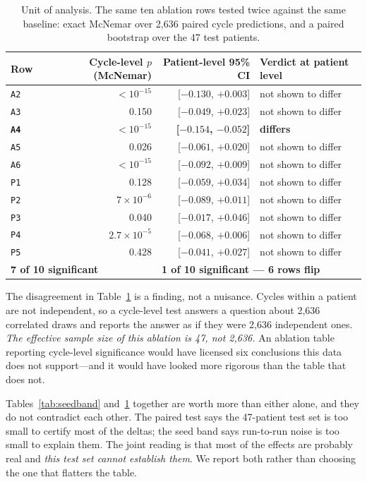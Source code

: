 \documentclass[journal,onecolumn]{IEEEtran}
\newcommand{\best}[1]{\textbf{#1}}
\begin{document}
\begin{table}[!t]
\centering
\caption{Unit of analysis. The same ten ablation rows tested twice against the
same baseline: exact McNemar over 2{,}636 paired cycle predictions, and a paired
bootstrap over the 47 test patients.}
\label{tab:unit}
\small
\begin{tabular}{lrrl}
\toprule
Row & Cycle-level $p$ (McNemar) & Patient-level 95\% CI & Verdict at patient level \\
\midrule
\texttt{A2} & $<10^{-15}$ & [$-0.130$, $+0.003$] & not shown to differ \\
\texttt{A3} & 0.150 & [$-0.049$, $+0.023$] & not shown to differ \\
\best{\texttt{A4}} & $<10^{-15}$ & \best{[$-0.154$, $-0.052$]} & \best{differs} \\
\texttt{A5} & 0.026 & [$-0.061$, $+0.020$] & not shown to differ \\
\texttt{A6} & $<10^{-15}$ & [$-0.092$, $+0.009$] & not shown to differ \\
\texttt{P1} & 0.128 & [$-0.059$, $+0.034$] & not shown to differ \\
\texttt{P2} & $7\times10^{-6}$ & [$-0.089$, $+0.011$] & not shown to differ \\
\texttt{P3} & 0.040 & [$-0.017$, $+0.046$] & not shown to differ \\
\texttt{P4} & $2.7\times10^{-5}$ & [$-0.068$, $+0.006$] & not shown to differ \\
\texttt{P5} & 0.428 & [$-0.041$, $+0.027$] & not shown to differ \\
\midrule
\multicolumn{2}{l}{\best{7 of 10 significant}} & \multicolumn{2}{l}{\best{1 of 10 significant --- 6 rows flip}} \\
\bottomrule
\end{tabular}
\end{table}

The disagreement in Table~\ref{tab:unit} is a finding, not a nuisance. Cycles
within a patient are not independent, so a cycle-level test answers a question
about 2{,}636 correlated draws and reports the answer as if they were 2{,}636
independent ones. \emph{The effective sample size of this ablation is 47, not
2{,}636.} An ablation table reporting cycle-level significance would have licensed
six conclusions this data does not support---and it would have looked more
rigorous than the table that does not.

Tables~\ref{tab:seedband} and~\ref{tab:unit} together are worth more than either
alone, and they do not contradict each other. The paired test says the 47-patient
test set is too small to certify most of the deltas; the seed band says run-to-run
noise is too small to explain them. The joint reading is that most of the effects
are probably real and \emph{this test set cannot establish them}. We report both
rather than choosing the one that flatters the table.
\end{document}
